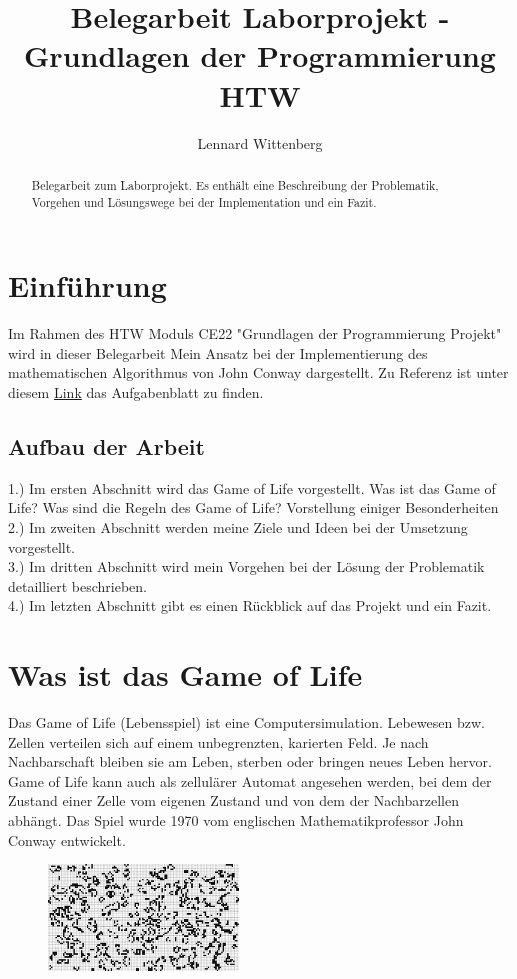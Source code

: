 \documentclass[11pt]{scrartcl}
\title{Belegarbeit Laborprojekt - Grundlagen der Programmierung HTW}
\author{Lennard Wittenberg}
\begin{document}
\maketitle

\begin{abstract}
Belegarbeit zum Laborprojekt. Es enthält eine Beschreibung der Problematik, Vorgehen und Lösungswege bei der Implementation und ein Fazit.
\end{abstract}
%
\newpage
%
\tableofcontents
%
\newpage
%
\section{Einführung}
%
\label{sec:intro}
Im Rahmen des HTW Moduls CE22 "Grundlagen der Programmierung Projekt" wird in dieser Belegarbeit Mein Ansatz bei der Implementierung des mathematischen Algorithmus von John Conway dargestellt.
Zu Referenz ist unter diesem \href{https://gitlab.rz.htw-berlin.de/Lennard.Wittenberg/c-wise-lennard-wittenberg/-/blob/main/projects.pdf}{Link} das Aufgabenblatt zu finden.
%
\subsection{Aufbau der Arbeit}
1.) Im ersten Abschnitt wird das Game of Life vorgestellt. Was ist das Game of Life? Was sind die Regeln des Game of Life? Vorstellung einiger Besonderheiten\\
2.) Im zweiten Abschnitt werden meine Ziele und Ideen bei der Umsetzung vorgestellt.\\
3.) Im dritten Abschnitt wird mein Vorgehen bei der Lösung der Problematik detailliert beschrieben.\\
4.) Im letzten Abschnitt gibt es einen Rückblick auf das Projekt und ein Fazit.
%
\section{Was ist das Game of Life}
\label{sec:info}
Das Game of Life (Lebensspiel) ist eine Computersimulation. Lebewesen bzw. Zellen verteilen sich auf einem unbegrenzten, karierten Feld. Je nach Nachbarschaft bleiben sie am Leben, sterben oder bringen neues Leben hervor.
Game of Life kann auch als zellulärer Automat angesehen werden, bei dem der Zustand einer Zelle vom eigenen Zustand und von dem der Nachbarzellen abhängt. 
Das Spiel wurde 1970 vom englischen Mathematikprofessor John Conway entwickelt.
\begin{figure}
\centering
\label{fig:Abb1}
\includegraphics[width=0.45\textwidth]{0 i4NRQkJRLh-21WNN.png}
\end{figure}
\end{document}
